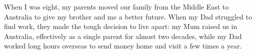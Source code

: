 \documentclass[11pt]{article}
\begin{document}


When I was eight, my parents moved our family from the Middle East to Australia to give my brother and me a better future. When my Dad struggled to find work, they made the tough decision to live apart: my Mum raised us in Australia, effectively as a single parent for almost two decades, while my Dad worked long hours overseas to send money home and visit a few times a year.
\psbreak

\psbreak

\psbreak

% 


\end{document}
